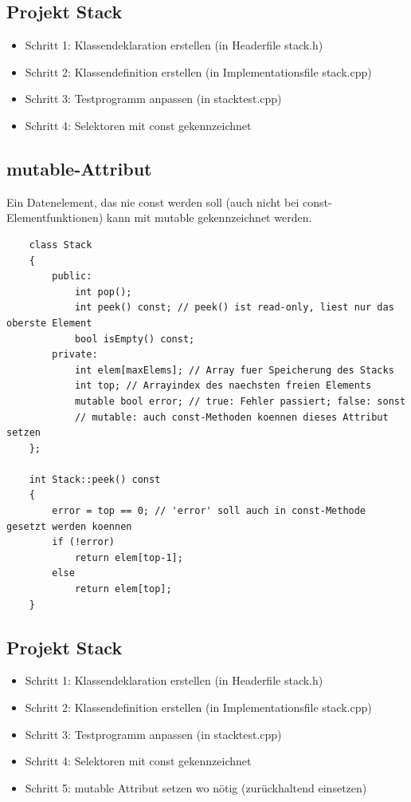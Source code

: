 \subsection{Projekt Stack}
\label{sec:Projekt Stack 2}
\begin{itemize}
	\item Schritt 1: Klassendeklaration erstellen (in Headerfile stack.h)
	\item Schritt 2: Klassendefinition erstellen (in Implementationsfile stack.cpp)
	\item Schritt 3: Testprogramm anpassen (in stacktest.cpp)
	\item Schritt 4: Selektoren mit const gekennzeichnet
\end{itemize}

\subsection{mutable-Attribut}
\label{sec:mutable-Attribut}
Ein Datenelement, das nie const werden soll (auch nicht bei const-Elementfunktionen) kann mit mutable gekennzeichnet werden.
\noindent
\begin{minipage}{\linewidth}
	\begin{lstlisting}
	class Stack
	{
		public:
			int pop();
			int peek() const; // peek() ist read-only, liest nur das oberste Element
			bool isEmpty() const;
		private:
			int elem[maxElems]; // Array fuer Speicherung des Stacks
			int top; // Arrayindex des naechsten freien Elements
			mutable bool error; // true: Fehler passiert; false: sonst
			// mutable: auch const-Methoden koennen dieses Attribut setzen
	};
	
	int Stack::peek() const
	{
		error = top == 0; // 'error' soll auch in const-Methode gesetzt werden koennen
		if (!error)
			return elem[top-1];
		else
			return elem[top];
	}
	\end{lstlisting}
\end{minipage}

\subsection{Projekt Stack}
\label{sec:Projekt Stack 3}
\begin{itemize}
	\item Schritt 1: Klassendeklaration erstellen (in Headerfile stack.h)
	\item Schritt 2: Klassendefinition erstellen (in Implementationsfile stack.cpp)
	\item Schritt 3: Testprogramm anpassen (in stacktest.cpp)
	\item Schritt 4: Selektoren mit const gekennzeichnet
	\item Schritt 5: mutable Attribut setzen wo nötig (zurückhaltend einsetzen)
\end{itemize}